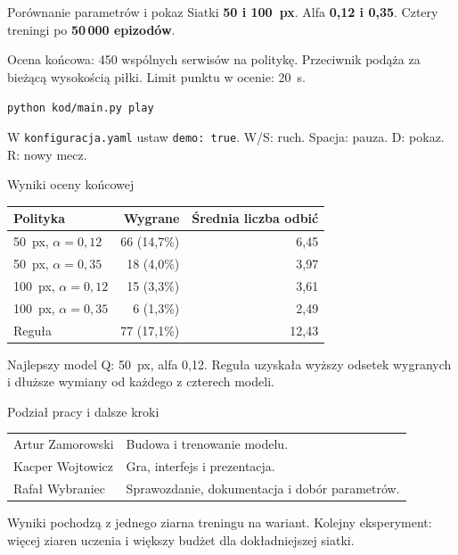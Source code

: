 \documentclass[11pt,aspectratio=169]{beamer}
\begin{document}
\begin{frame}[t]{Porównanie parametrów i pokaz}
  Siatki \textbf{50 i 100~px}. Alfa \textbf{0,12 i 0,35}.
  Cztery treningi po \textbf{50\,000 epizodów}.

  \vspace{4mm}
  Ocena końcowa: 450 wspólnych serwisów na politykę.
  Przeciwnik podąża za bieżącą wysokością piłki.
  Limit punktu w ocenie: 20~s.

  \vspace{4mm}
  \texttt{python kod/main.py play}

  W \texttt{konfiguracja.yaml} ustaw \texttt{demo: true}.
  W/S: ruch. Spacja: pauza. D: pokaz. R: nowy mecz.
\end{frame}

\begin{frame}[t]{Wyniki oceny końcowej}
  \begin{tabularx}{\linewidth}{@{}Xrr@{}}
    \toprule
    Polityka & Wygrane & Średnia liczba odbić \\
    \midrule
    50~px, $\alpha=0{,}12$ & 66 (14,7\%) & 6,45 \\
    50~px, $\alpha=0{,}35$ & 18 (4,0\%) & 3,97 \\
    100~px, $\alpha=0{,}12$ & 15 (3,3\%) & 3,61 \\
    100~px, $\alpha=0{,}35$ & 6 (1,3\%) & 2,49 \\
    Reguła & 77 (17,1\%) & 12,43 \\
    \bottomrule
  \end{tabularx}

  \vspace{4mm}
  Najlepszy model Q: 50~px, alfa 0,12.
  Reguła uzyskała wyższy odsetek wygranych i dłuższe wymiany
  od każdego z czterech modeli.
\end{frame}

\begin{frame}[t]{Podział pracy i dalsze kroki}
  \begin{tabularx}{\linewidth}{@{}lX@{}}
    Artur Zamorowski & Budowa i trenowanie modelu. \\
    Kacper Wojtowicz & Gra, interfejs i prezentacja. \\
    Rafał Wybraniec & Sprawozdanie, dokumentacja i dobór parametrów. \\
  \end{tabularx}

  \vspace{7mm}
  Wyniki pochodzą z jednego ziarna treningu na wariant.
  Kolejny eksperyment: więcej ziaren uczenia i większy budżet
  dla dokładniejszej siatki.
\end{frame}
\end{document}
